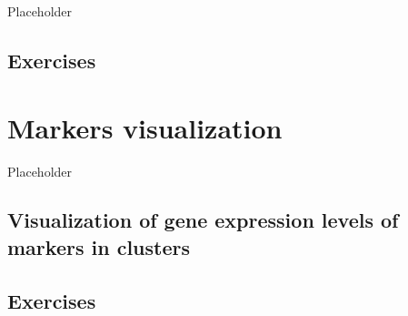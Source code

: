 \documentclass[
]{book}
\begin{document}
Placeholder

\hypertarget{exercises-5}{%
\section{Exercises}\label{exercises-5}}

\hypertarget{markers-visualization}{%
\chapter{Markers visualization}\label{markers-visualization}}

Placeholder

\hypertarget{visualization-of-gene-expression-levels-of-markers-in-clusters}{%
\section{Visualization of gene expression levels of markers in clusters}\label{visualization-of-gene-expression-levels-of-markers-in-clusters}}

\hypertarget{exercises-6}{%
\section{Exercises}\label{exercises-6}}

\printbibliography
\end{document}
